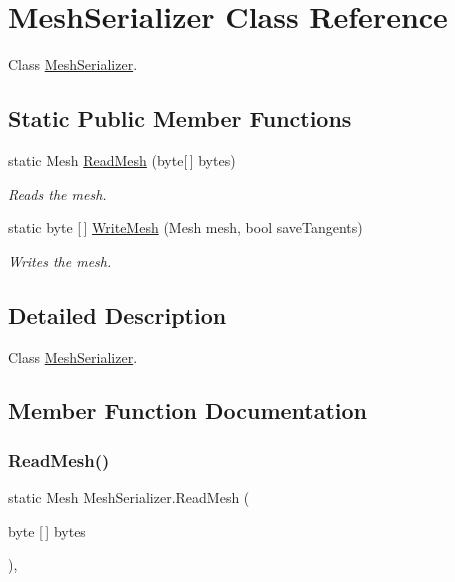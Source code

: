 \hypertarget{class_mesh_serializer}{}\section{Mesh\+Serializer Class Reference}
\label{class_mesh_serializer}


Class \hyperlink{class_mesh_serializer}{Mesh\+Serializer}.  


\subsection*{Static Public Member Functions}
\begin{DoxyCompactItemize}
\item 
static Mesh \hyperlink{class_mesh_serializer_a1c6aef0dba2aaa2dc8724f6e50b0ea6d}{Read\+Mesh} (byte\mbox{[}$\,$\mbox{]} bytes)
\begin{DoxyCompactList}\small\item\em Reads the mesh. \end{DoxyCompactList}\item 
static byte \mbox{[}$\,$\mbox{]} \hyperlink{class_mesh_serializer_a7e90d8200b8ac6c34a867a0e5eb47363}{Write\+Mesh} (Mesh mesh, bool save\+Tangents)
\begin{DoxyCompactList}\small\item\em Writes the mesh. \end{DoxyCompactList}\end{DoxyCompactItemize}


\subsection{Detailed Description}
Class \hyperlink{class_mesh_serializer}{Mesh\+Serializer}. 



\subsection{Member Function Documentation}
\mbox{\label{class_mesh_serializer_a1c6aef0dba2aaa2dc8724f6e50b0ea6d}} 
\subsubsection{\texorpdfstring{Read\+Mesh()}{ReadMesh()}}
{\footnotesize\ttfamily static Mesh Mesh\+Serializer.\+Read\+Mesh (\begin{DoxyParamCaption}\item[{byte \mbox{[}$\,$\mbox{]}}]{bytes }\end{DoxyParamCaption})\hspace{0.3cm}{\ttfamily [inline]}, {\ttfamily [static]}}



